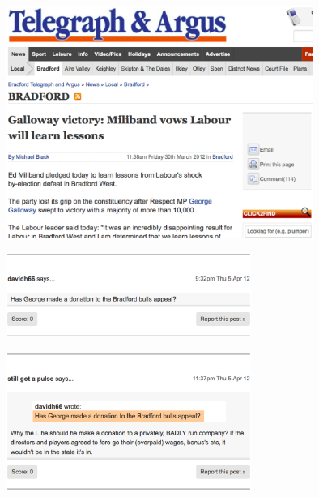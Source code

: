 \begin{frame}
   \begin{center}
     \includegraphics[width=10cm]{graphicswcc/argus2}\\
   \end{center}  
\end{frame}


 \begin{frame}

   \begin{center}
     \includegraphics[width=8cm]{graphicswcc/george1col2}\\
   \end{center}
\pause
  \begin{center}
     \includegraphics[width=8cm]{graphicswcc/george2col2}\\
   \end{center}

 \end{frame}



